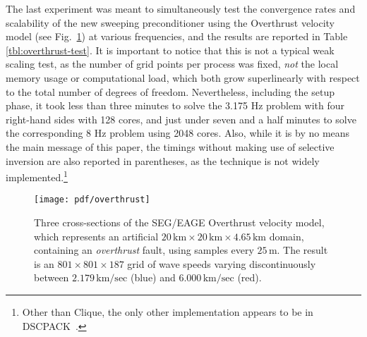 The last experiment was meant to simultaneously test the convergence rates and 
scalability of the new sweeping preconditioner using the Overthrust velocity 
model (see Fig.~\ref{fig:overthrust}) at various frequencies, and the results
are reported in Table \ref{tbl:overthrust-test}.
It is important to notice that this is not a typical weak scaling test, as
the number of grid points per process was fixed, {\em not} the local memory 
usage or computational load, which both grow superlinearly with respect to the
total number of degrees of freedom. Nevertheless, including the setup phase, 
it took less than three minutes to solve the 3.175 Hz problem with 
four right-hand sides with 128 cores, and just under seven and a half minutes
to solve the corresponding 8 Hz problem using 2048 cores.
Also, while it is by no means the main 
message of this paper, the timings without making use of selective inversion 
are also reported in parentheses, as the technique is not widely 
implemented.\footnote{Other than Clique, the only other implementation appears 
to be in DSCPACK~\cite{Raghavan-dscpack}.}

\begin{figure}
\centering
\texttt{[image: pdf/overthrust]}
\caption{Three cross-sections of the SEG/EAGE Overthrust velocity model, which 
represents an artificial 
$20\, \mathrm{km} \times 20\, \mathrm{km} \times 4.65\, \mathrm{km}$ domain, 
containing an {\em overthrust} fault, using samples every $25\, \mathrm{m}$. 
The result is an $801 \times 801 \times 187$ grid of wave speeds varying 
discontinuously between $2.179\, \mathrm{km/sec}$ (blue) and 
$6.000\, \mathrm{km/sec}$ (red).}
\label{fig:overthrust}
\end{figure}


